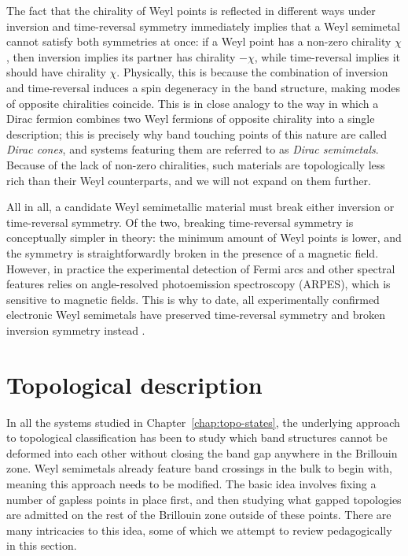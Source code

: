 The fact that the chirality of Weyl points is reflected in different ways under inversion and time-reversal symmetry immediately implies that a Weyl semimetal cannot satisfy both symmetries at once: if a Weyl point has a non-zero chirality $\chi$, then inversion implies its partner has chirality $-\chi$, while time-reversal implies it should have chirality $\chi$. Physically, this is because the combination of inversion and time-reversal induces a spin degeneracy in the band structure, making modes of opposite chiralities coincide. This is in close analogy to the way in which a Dirac fermion combines two Weyl fermions of opposite chirality into a single description; this is precisely why band touching points of this nature are called \emph{Dirac cones}, and systems featuring them are referred to as \emph{Dirac semimetals}. Because of the lack of non-zero chiralities, such materials are topologically less rich than their Weyl counterparts, and we will not expand on them further.

All in all, a candidate Weyl semimetallic material must break either inversion or time-reversal symmetry. Of the two, breaking time-reversal symmetry is conceptually simpler in theory: the minimum amount of Weyl points is lower, and the symmetry is straightforwardly broken in the presence of a magnetic field. However, in practice the experimental detection of Fermi arcs and other spectral features relies on angle-resolved photoemission spectroscopy (ARPES), which is sensitive to magnetic fields. This is why to date, all experimentally confirmed electronic Weyl semimetals have preserved time-reversal symmetry and broken inversion symmetry instead  \cite{Weng_WSM-candidates,Huang_WSM-candidates,Lv_WSM-TaAs,Xu_WSM-experiment,Belopolski_minimal-WSM}.


\section{Topological description}\label{sec:semimetal-topology}

In all the systems studied in Chapter~\ref{chap:topo-states}, the underlying approach to topological classification has been to study which band structures cannot be deformed into each other without closing the band gap anywhere in the Brillouin zone. Weyl semimetals already feature band crossings in the bulk to begin with, meaning this approach needs to be modified. The basic idea involves fixing a number of gapless points in place first, and then studying what gapped topologies are admitted on the rest of the Brillouin zone outside of these points. There are many intricacies to this idea, some of which we attempt to review pedagogically in this section.

